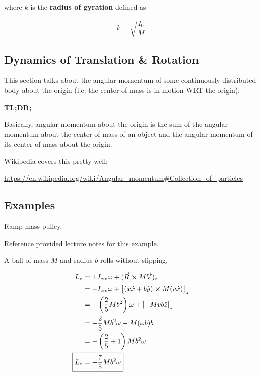 where $k$ is the \textbf{radius of gyration} defined as

\begin{equation}
	k = \sqrt{\frac{I_0}{M}}
\end{equation}

\subsection{Dynamics of Translation \& Rotation}

This section talks about the angular momentum of some continuously distributed body about the origin (i.e. the center of mass is in motion WRT the origin).

\textbf{TL;DR;}

Basically, angular momentum about the origin is the sum of the angular momentum about the center of mass of an object and the angular momentum of its center of mass about the origin.

Wikipedia covers this pretty well:

\url{https://en.wikipedia.org/wiki/Angular_momentum#Collection_of_particles}

\subsection{Examples}

\begin{example}
	Ramp mass pulley.
\end{example}

Reference provided lecture notes for this example.

\begin{example}
	A ball of mass $M$ and radius $b$ rolls without slipping.
\end{example}

\begin{sol}
	\begin{align}
		L_z &= \pm I_\mathrm{cm} \omega + (\vec R \cross M\vec V)_z\\
		&=  - I_\mathrm{cm} \omega + \left[(x \hat x + b \hat y) \cross M (v \hat x)\right]_z\\
		&= - \left(\frac{2}{5} Mb^2\right) \omega + \left[-Mvb \hat z\right]_z\\
		&= - \frac{2}{5} Mb^2 \omega - M(\omega b) b\\
		&= -\left(\frac{2}{5} + 1\right) Mb^2\omega\\
		\Aboxed{L_z &= - \frac{7}{5} Mb^2 \omega}
	\end{align}
\end{sol}

